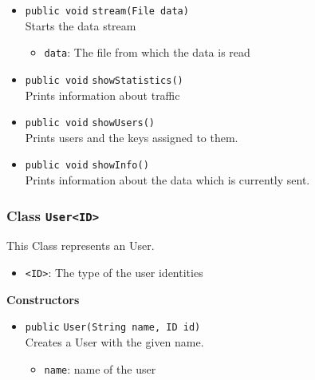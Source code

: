 \begin{itemize}
\item \lstinline|public void| \lstinline|stream|\lstinline|(File data)|\\
Starts the data stream
\begin{itemize}
\item \lstinline|data|: The file from which the data is read
\end{itemize}



\item \lstinline|public void| \lstinline|showStatistics|\lstinline|()|\\
Prints information about traffic



\item \lstinline|public void| \lstinline|showUsers|\lstinline|()|\\
Prints users and the keys assigned to them.



\item \lstinline|public void| \lstinline|showInfo|\lstinline|()|\\
Prints information about the data which is currently sent.



\end{itemize}

\subsubsection{Class \lstinline|User<ID>|}
This Class represents an User. \\


\begin{itemize}
\item \lstinline|<ID>|: The type of the user identities
\end{itemize}


\textbf{Constructors}
\begin{itemize}
\item \lstinline|public| \lstinline|User|\lstinline|(String name, ID id)|\\
Creates a User with the given name.
\begin{itemize}
\item \lstinline|name|: name of the user
\end{itemize}



\end{itemize}



